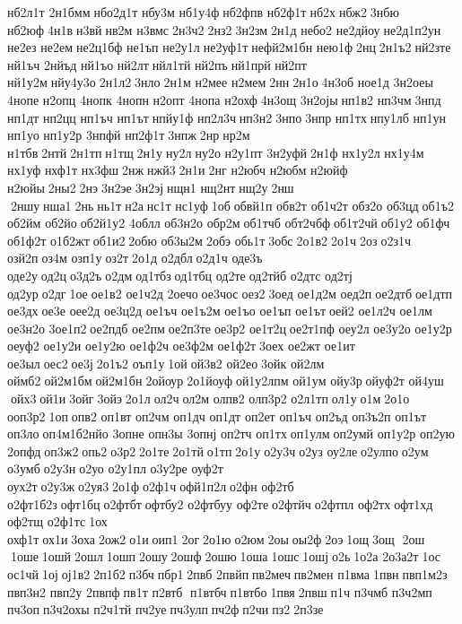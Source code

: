 нб2л1т 
2н1бмм нбо2д1т 	нбу3м 
нб1у4ф нб2фпв 
нб2ф1т нб2х нбж2 3нбю 	нб2юф 4н1в н3вй нв2м 	н3вмс 2н3ч2 2нз2 3н2зм 2н1д 	небо2 
не2дйоу не2д1п2ун 	не2ез 	не2ем не2ц1бф 	не1ъп 
не2у1л не2уф1т нефй2м1бн 	нею1ф 2нц 2н1ъ2 нй2зте 	нй1ъч 	2нйъд 	нй1ъо 	нй2лт нйл1тй 	нй2пъ нй1прй 	нй2пт 
нй1у2м нйу4у3о 2н1л2 3нло 2н1м 	н2мее 	н2мем 2нн 2н1о 4н3об 	ное1д 
3н2оеы 	4нопе 	н2опц 	4нопк 	4нопн 	н2опт 	4нопа 	н2охф 4н3ощ 
3н2ојы нп1в2 	нп3чм 3нпд 	нп1дт 	нп2цц 	нп1ъч 	нп1ът нпйу1ф 
нп2л3ч нп3н2 3нпо 3нпр 	нп1тх нпу1лб 	нп1ун 	нп1уо 
нп1у2р 	3нпфй 
нп2ф1т 3нпж 2нр нр2м 	н1тбв 2нтй 2н1тп н1тщ 2н1у ну2л ну2о 
н2у1пт 
3н2уфй 2н1ф 
нх1у2л 
нх1у4м 	нх1уф 	нхф1т 	нх3фш 2нж нжй3 2н1и 2нг 	н2юбч 	н2юбм 	н2юйф 	н2юйы 2ны2 2нэ 3н2эе 3н2эј нщн1 	нщ2нт нщ2у 2нш  2ншу нша1 2нь нь1т н2а нс1т 	нс1уф 1об обвй1п 	обв2т 
об1ч2т 	обз2о 	об3цд об1ъ2 	об2йм 	об2йо об2й1у2 	4облл 
об3н2о 	обр2м об1тчб 
обт2чбф об1т2чй об1у2 	об1фч 
об1ф2т 
о1б2жт об1и2 2обю 
об3ы2м 2обэ 	обь1т 3обс 2о1в2 2о1ч 2оз о2з1ч 	озй2п оз4м 	озп1у оз2т 2о1д 	о2дбл о2д1ч 	оде3ъ 	оде2у од2ц о3д2ъ о2дм од1тбз од1тбц 	од2те од2тйб 	о2дтс 	од2тј 	од2ур о2дг 1ое ое1в2 
ое1ч2д 	2оечо ое3чос оез2 3оед 
ое1д2м 	оед2п ое2дтб ое1дтп 	ое3дх ое3е 	оее2д 
ое3ц2д 	ое1ъч 
ое1ъ2м 	ое1ъо 	ое1ъп 	ое1ът оей2 
ое1л2ч 	ое1лм 
ое3н2о 	3ое1п2 ое2пдб 	ое2пм ое2п3те ое3р2 
ое1т2ц ое2т1пф 	оеу2л 
ое3у2о 
ое1у2р 	оеуф2 
ое1у2и 
ое1у2ю 
ое1ф2ч 
ое3ф2м 
ое1ф2т 3оех 	ое2жт 	ое1ит 	ое3ыл оес2 ое3ј 2о1ъ2 	оъп1у 1ой ой3в2 	ой2ео 3ойк 	ой2лм 	оймб2 ой2м1бм ой2м1бн 2ойоур 2о1йоуф ой1у2лпм 	ой1ум 	ойу3р ойуф2т 
ой4уш  ойх3 ой1и 3ойг 3ойэ 2о1л ол2ч ол2м 	олпв2 
олп3р2 
о2л1тп ол1у о1м 2о1о 
ооп3р2 1оп опв2 	оп1вт 	оп2чм 	оп1дч 	оп1дт 	оп2ет 	оп1ъч 	оп2ъд 
оп3ъ2п 	оп1ът 	оп3ло оп4м1б2нйо 	3опне 	опн3ы 	3опнј 	оп2тч 	оп1тх оп1улм оп2умй 
оп1у2р 	оп2ую 	2опфд оп3ж2 опь2 о3р2 2о1те 2о1тй о1тп 2о1у о2у3ч о2уз 	оу2ле о2улпо о2ум 	о3умб о2у3н о2уо 
о2у1пл 
о3у2ре 	оуф2т 	оух2т о2у3ж о2уя3 2о1ф о2ф1ч офй1п2л о2фн 	оф2тб 
о2фт1б2з офт1бц о2фтбт офтбу2 
о2фтбуу 	оф2те о2фтйч о2фтпл 	оф2тх офт1хд 	оф2тщ 
о2ф1тс 1ох 	охф1т ох1и 3оха 2ож2 о1и оип1 2ог 2о1ю о2юм 2оы оы2ф 2оэ 1ощ 3ощ  2ош  1оше 1ошй 2ошл 1ошп 2ошу 2ошф 2ошю 1оша 1ошс 1ошј о2ь 1о2а 	2о3а2т 1ос 	ос1чй 1ој ој1в2 2п1б2 п3бч пбр1 2пвб 	2пвйп пв2меч пв2мен 	п1вма 1пвн пвп1м2з 
пвп3н2 	пвп2у 	2пвпф пв1т 
п2втб  п1втбч п1втбо 1пвя 2пвш п1ч 	п3чмб 
п3ч2мп 	пч3оп п3ч2охы 
п2ч1тй 	пч2уе пч3улп пч2ф п2чи пз2 2п3зе 
